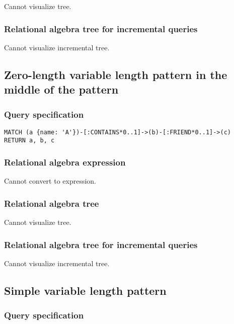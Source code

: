 Cannot visualize tree.

\subsubsection*{Relational algebra tree for incremental queries}

Cannot visualize incremental tree.

\subsection{Zero-length variable length pattern in the middle of the pattern}

\subsubsection*{Query specification}

\begin{lstlisting}
MATCH (a {name: 'A'})-[:CONTAINS*0..1]->(b)-[:FRIEND*0..1]->(c)
RETURN a, b, c
\end{lstlisting}

\subsubsection*{Relational algebra expression}

Cannot convert to expression.

\subsubsection*{Relational algebra tree}

Cannot visualize tree.

\subsubsection*{Relational algebra tree for incremental queries}

Cannot visualize incremental tree.

\subsection{Simple variable length pattern}

\subsubsection*{Query specification}

